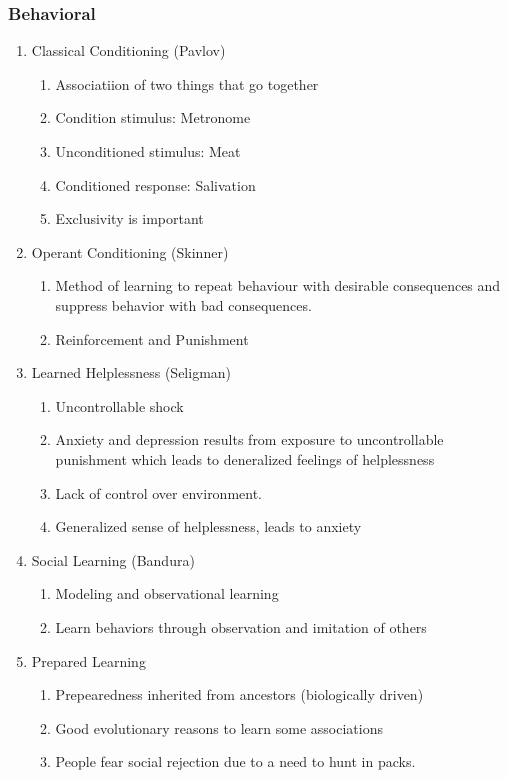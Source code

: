 \documentclass[12pt]{article}
\begin{document}
\subsubsection{Behavioral}
\begin{enumerate}
\item Classical Conditioning (Pavlov)
  \begin{enumerate}
  \item Associatiion of two things that go together
  \item Condition stimulus: Metronome
  \item Unconditioned stimulus: Meat
  \item Conditioned response: Salivation
  \item Exclusivity is important
  \end{enumerate}
\item Operant Conditioning (Skinner)
  \begin{enumerate}
  \item Method of learning to repeat behaviour with desirable
    consequences and suppress behavior with bad consequences.
  \item Reinforcement and Punishment
  \end{enumerate}
\item Learned Helplessness (Seligman)
  \begin{enumerate}
  \item Uncontrollable shock
  \item Anxiety and depression results from exposure to uncontrollable
    punishment which leads to deneralized feelings of helplessness
  \item Lack of control over environment. 
  \item Generalized sense of helplessness, leads to anxiety
  \end{enumerate}
\item Social Learning (Bandura)
  \begin{enumerate}
  \item Modeling and observational learning
  \item Learn behaviors through observation and imitation of others
  \end{enumerate}
\item Prepared Learning
  \begin{enumerate}
  \item Prepearedness inherited from ancestors (biologically driven)
  \item Good evolutionary reasons to learn some associations
  \item People fear social rejection due to a need to hunt in packs.
  \end{enumerate}
\end{enumerate}
\end{document}
